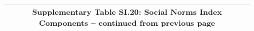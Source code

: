 \begin{longtable}{llcccccccccc}
\multicolumn{12}{c}{{\bfseries Supplementary Table SI.20: Social Norms Index Components -- continued from previous page}} \\ \hline                                                                                                                                                                                                                                                                                                                                                                                                                                                                                                                                                                                                                                                                                                                                                       

\end{longtable}
